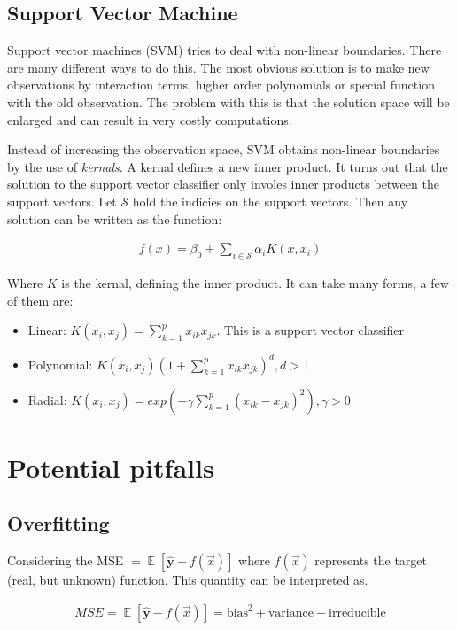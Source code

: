 \documentclass{article}
\newcommand{\uvec}[1]{\mathbf{\hat{#1}}}
\DeclareMathOperator*{\E}{\mathbb{E}}
\begin{document}
\subsection{Support Vector Machine}
Support vector machines (SVM) tries to deal with non-linear boundaries. There are many different ways to do this. The most obvious solution is to make new observations by interaction terms, higher order polynomials or special function with the old observation. The problem with this is that the solution space will be enlarged and can result in very costly computations.  

Instead of increasing the observation space, SVM obtains non-linear boundaries by the use of \textit{kernals}. A kernal defines a new inner product. It turns out that the solution to the support vector classifier only involes inner products between the support vectors. Let $\mathcal{S}$ hold the indicies on the support vectors. Then any solution can be written as the function:

\begin{align*}
    f(x) = \beta_0 + \sum_{i \in \mathcal{S}} \alpha_i K(x, x_i)
\end{align*}

Where $K$ is the kernal, defining the inner product. It can take many forms, a few of them are:

\begin{itemize}
    \item Linear: $K(x_i, x_j) = \sum_{k=1}^{p} x_{ik}x_{jk}$. This is a support vector classifier
    \item Polynomial: $K(x_i, x_j) \left( 1+ \sum_{k=1}^{p} x_{ik}x_{jk}\right)^d, d > 1$
    \item Radial: $K(x_i, x_j) = exp(-\gamma \sum_{k=1}^{p}(x_{ik}-x_{jk})^2), \gamma > 0$
\end{itemize}
\section{Potential pitfalls}
\subsection{Overfitting}
Considering the MSE $ = \E[\uvec{y}-f(\Vec{x})]$ where $f(\Vec{x})$ represents the target (real, but unknown) function. This quantity can be interpreted as.

\begin{align*}
    MSE = \E[\uvec{y}-f(\Vec{x})] = \text{bias}^2 + \text{variance} + \text{irreducible}
\end{align*}
\end{document}
